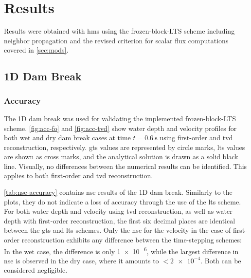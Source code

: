\section{Results}\label{sec:results}

Results were obtained with \gls{hms} using the \gls{frozen-block-LTS} scheme including neighbor propagation and the revised criterion for scalar flux computations covered in \autoref{sec:mods}.


\subsection{1D Dam Break} 

\subsubsection{Accuracy} \label{sec:results-accuracy-analytical}

The \gls{1D} dam break was used for validating the implemented \gls{frozen-block-LTS} scheme.
\autoref{fig:acc-fo} and \autoref{fig:acc-tvd} show water depth and velocity profiles for both wet and dry dam break cases at time $t=\SI{0.6}{\second}$ using first-order and \gls{tvd} reconstruction, respectively.
\gls{gts} values are represented by circle marks,
\gls{lts} values are shown as cross marks,
and the analytical solution is drawn as a solid black line.
Visually, no differences between the numerical results can be identified.
This applies to both first-order and \gls{tvd} reconstruction.

\autoref{tab:nse-accuracy} contains \gls{nse} results of the \gls{1D} dam break.
Similarly to the plots, they do not indicate a loss of accuracy through the use of the \gls{lts} scheme.
For both water depth and velocity using \gls{tvd} reconstruction, as well as water depth with first-order reconstruction,
the first six decimal places 
are identical between the \gls{gts} and \gls{lts} schemes.
Only the \gls{nse} for the velocity in the case of first-order reconstruction exhibits any difference between the time-stepping schemes:
In the wet case, the difference is only \num{1e-6}, while the largest difference in \gls{nse} is observed in the dry case, where it amounts to $<\num{2e-4}$. Both can be considered negligible.

